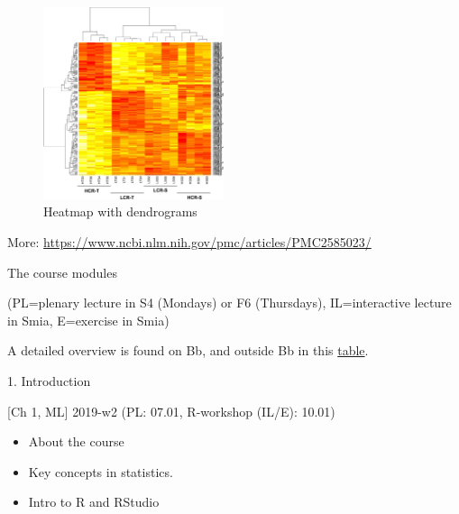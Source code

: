 \documentclass[10pt,ignorenonframetext,]{beamer}
\providecommand{\tightlist}{%
  \setlength{\itemsep}{0pt}\setlength{\parskip}{0pt}}
\begin{document}
\begin{frame}

\begin{figure}
\includegraphics[width=150pt]{heatmap} \caption{Heatmap with dendrograms}\label{fig:heatmap_pic}
\end{figure}

\tiny
More: \url{https://www.ncbi.nlm.nih.gov/pmc/articles/PMC2585023/}

\end{frame}

\begin{frame}

\end{frame}

\begin{frame}{The course modules}

(PL=plenary lecture in S4 (Mondays) or F6 (Thursdays), IL=interactive
lecture in Smia, E=exercise in Smia)

A detailed overview is found on Bb, and outside Bb in this
\href{https://www.math.ntnu.no/emner/TMA4268/2019v/table2019.html}{table}.

\begin{block}{1. Introduction}

{[}Ch 1, ML{]} 2019-w2 (PL: 07.01, R-workshop (IL/E): 10.01)

\begin{itemize}
\tightlist
\item
  About the course
\item
  Key concepts in statistics.
\item
  Intro to R and RStudio
\end{itemize}

\end{block}

\end{frame}
\end{document}
